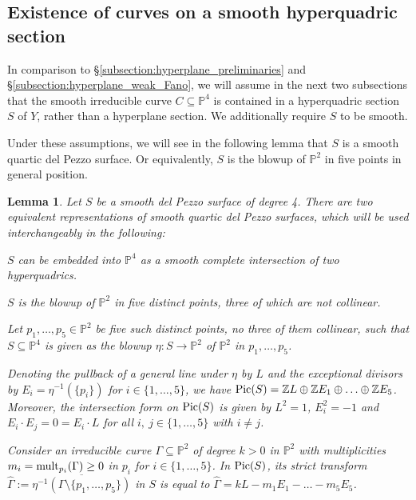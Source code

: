 \documentclass[english,11pt,reqno]{amsart}
\newcommand{\sub}{\subseteq}
\newcommand{\Ptwo}{\mathbb{P}^2}
\newcommand{\Pfour}{\mathbb{P}^4}
\newcommand{\Z}{\mathbb{Z}}
\newtheorem{lem}[thm]{Lemma}
\begin{document}
\subsection{Existence of curves on a smooth hyperquadric section} \label{subsection:hyperquadric_preliminaries}
%
%
In comparison to \S\ref{subsection:hyperplane_preliminaries} and \S\ref{subsection:hyperplane_weak_Fano}, we will assume in the next two subsections that the smooth irreducible curve $C\sub \Pfour$ is contained in a hyperquadric section $S$ of $Y$, rather than a hyperplane section. We additionally require $S$ to be smooth. \par
Under these assumptions, we will see in the following lemma that $S$ is a smooth quartic del Pezzo surface. Or equivalently, $S$ is the blowup of $\Ptwo$ in five points in general position. 
%
%
\begin{lem} \label{lem:quartic_del_Pezzo_surface}
Let $S$ be a smooth del Pezzo surface of degree 4. There are two equivalent representations of smooth quartic del Pezzo surfaces, which will be used interchangeably in the following:
\begin{enumlem}
\item $S$ can be embedded into $\Pfour$ as a smooth complete intersection of two hyperquadrics. \label{quartic_del_Pezzo_surface_intersection_hyperquadrics}
\item $S$ is the blowup of $\Ptwo $ in five distinct points, three of which are not collinear. \label{quartic_del_Pezzo_surface_blowup_in_five_points}
\end{enumlem}
%
%
Let $p_1,\dots,p_5\in \Ptwo$ be five such distinct points, no three of them collinear, such that $S\sub \Pfour$ is given as the blowup $\eta: S \rightarrow \Ptwo $ of $\Ptwo$ in $p_1,\dots,p_5$. \par 
Denoting the pullback of a general line under $\eta$ by $L$ and the exceptional divisors by $E_i=\eta^{-1}(\{p_i\})$ for $i \in \{1,\dots,5\}$, we have $\textup{Pic}(S) = \Z L \oplus \Z E_1 \oplus {\dots} \oplus \Z E_5 $. Moreover, the intersection form on $\textup{Pic}(S)$ is given by $L^2=1$, $E_i^2 = -1$ and $E_i \cdot E_j = 0 = E_i \cdot L$ for all $i,\:j\in\{1,\dots,5\}$ with $i\not=j$.\par
Consider an irreducible curve $\Gamma \sub \Ptwo$ of degree $k>0$ in $\Ptwo$ with multiplicities $m_i = \textup{mult}_{p_i}(\Gamma) \geq 0$ in $p_i$ for $i\in\{1,\dots,5\}$. In $\textup{Pic}(S)$, its strict transform $\hat{\Gamma}:= \overline{\eta^{-1}(\Gamma \setminus \{p_1,\dots,p_5\})}$ in $ S$ is equal to $ \hat{\Gamma} = k L - m_1 E_1 - {\dots} - m_5 E_5$. 

\end{lem}
\end{document}

